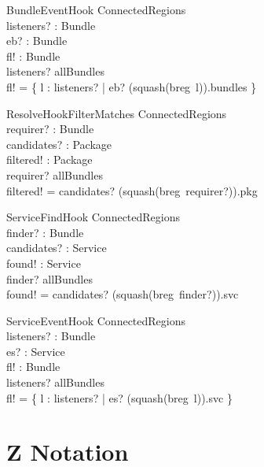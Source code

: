 \documentclass[a4paper,9pt]{article}
\begin{document}
\begin{schema}{BundleEventHook}
  \Xi ConnectedRegions \\
  listeners? : \power Bundle \\
  eb? : Bundle \\
  fl! : \power Bundle \\
\where
  listeners? \subseteq allBundles \\
  fl! = \{ l : listeners? | eb? \in (squash(breg~l)).bundles \} \\
\end{schema}

\begin{schema}{ResolveHookFilterMatches}
  \Xi ConnectedRegions \\
  requirer? : Bundle \\
  candidates? : \power Package \\
  filtered! : \power Package \\
\where
  requirer? \in allBundles \\
  filtered! = candidates? \cap (squash(breg~requirer?)).pkg \\
\end{schema}

\begin{schema}{ServiceFindHook}
  \Xi ConnectedRegions \\
  finder? : Bundle \\
  candidates? : \power Service \\
  found! : \power Service \\
\where
  finder? \in allBundles \\
  found! = candidates? \cap (squash(breg~finder?)).svc \\
\end{schema}

\begin{schema}{ServiceEventHook}
  \Xi ConnectedRegions \\
  listeners? : \power Bundle \\
  es? : Service \\
  fl! : \power Bundle \\
\where
  listeners? \subseteq allBundles \\
  fl! = \{ l : listeners? | es? \in (squash(breg~l)).svc \} \\
\end{schema}


\newpage
\section{Z Notation}
\label{cha:znot}
\end{document}
